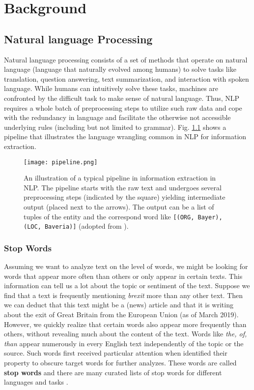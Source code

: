 \chapter{Background}

\section{Natural language Processing}
Natural language processing consists of a set of methods that operate on natural language (language that naturally evolved among humans) to solve tasks like translation, question answering, text summarization, and interaction with spoken language. While humans can intuitively solve these tasks, machines are confronted by the difficult task to make sense of natural language. Thus, NLP requires a whole batch of preprocessing steps to utilize such raw data and cope with the redundancy in language and facilitate the otherwise not accessible underlying rules (including but not limited to grammar). Fig. \ref{fig:pipeline} shows a pipeline that illustrates the language wrangling common in NLP for information extraction.

\begin{figure}[h!]
  \centering
  \texttt{[image: pipeline.png]}
  \caption{An illustration of a typical pipeline in information extraction in NLP. The pipeline starts with the raw text and undergoes several preprocessing steps (indicated by the square) yielding intermediate output (placed next to the arrows). The output can be a list of tuples of the entity and the correspond word like \texttt{[(ORG, \textquotesingle Bayer\textquotesingle), (LOC, \textquotesingle Baveria\textquotesingle)]} (adopted from \citep{Bird2009}).}
\label{fig:pipeline}
\end{figure}

\subsection{Stop Words}
Assuming we want to analyze text on the level of words, we might be looking for
words that appear more often than others or only appear in certain texts.
This information can tell us a lot about the topic or sentiment of the text.
Suppose we find that a text is frequently mentioning \textit{brexit} more than any other text.
Then we can deduct that this text might be a (news) article and that it is writing about the exit of Great Britain from the European Union (as of March 2019).
However, we quickly realize that certain words also appear more frequently than others, without revealing much about the content of the text.
Words like \textit{the, of, than} appear numerously in every English text independently of the topic or the source.
Such words first received particular attention when \cite{Luhn1960}  identified their property to obscure target words for further analyzes.
These words are called \textbf{stop words} and there are many curated lists of stop words for different languages and tasks \citep{RANKS2019}.

